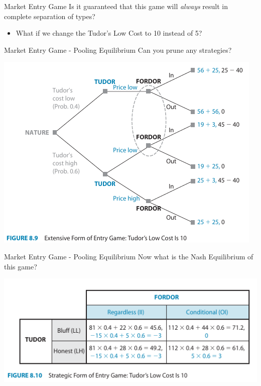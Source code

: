 
\begin{frame}{Market Entry Game}
  Is it guaranteed that this game will \textit{always} 
  result in complete separation of types?
  \begin{itemize}
    \item What if we change the Tudor's Low Cost to 10 instead of 5? 
  \end{itemize}
\end{frame}


\begin{frame}{Market Entry Game - Pooling Equilibrium}
  Can you prune any strategies?
  \begin{center}
    \includegraphics[width=.9\textwidth]{figures/Fig89.png}
  \end{center}
\end{frame}


\begin{frame}{Market Entry Game - Pooling Equilibrium}
  Now what is the Nash Equilibrium of this game?
  \begin{center}
    \includegraphics[width=.9\textwidth]{figures/Fig810.png}
  \end{center}
\end{frame}

